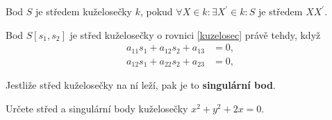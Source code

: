 \begin{definition}
    Bod $S$ je středem kuželosečky $k$, pokud $\forall X\in k\colon \exists X^\prime\in k\colon  S$ je středem $XX^\prime.$
\end{definition}

\begin{veta}
    Bod $S[s_1,s_2]$ je střed kuželosečky o rovnici \ref{kuzelosec} právě tehdy, když
    \begin{align*}
        a_{11}s_1 + a_{12}s_2+a_{13}&=0,\\
        a_{12}s_1 + a_{22}s_2 + a_{23}&=0,
    \end{align*}
\end{veta}

\begin{definition}
    Jestliže střed kuželosečky na ní leží, pak je to \textbf{singulární bod}.
\end{definition}

\begin{priklad}
Určete střed a singulární body kuželosečky $x^2+y^2+2x=0.$
\end{priklad}

